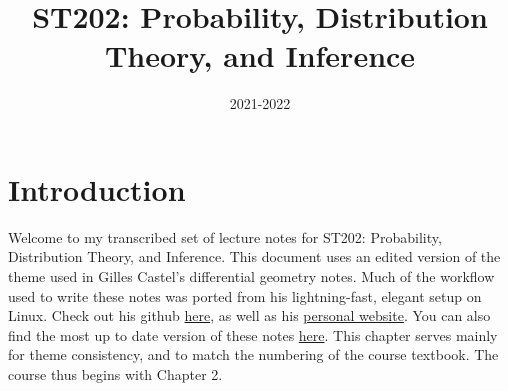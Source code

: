 \documentclass[a4paper]{report}
\title{\Huge\textsf{ST202: Probability, Distribution Theory, and Inference}}
\affil{\vskip.5cm\textsf{The London School of Economics and Political Science}}
\date{\textsf{2021-2022}}
\begin{document}
    \maketitle
    \tableofcontents
	\clearpage
\chapter{Introduction}
Welcome to my transcribed set of lecture notes for ST202: Probability, Distribution Theory, and Inference. This document uses an edited version of the theme used in Gilles Castel's differential geometry notes. Much of the workflow used to write these notes was ported from his lightning-fast, elegant setup on Linux. Check out his github \href{https://github.com/gillescastel}{here}, as well as his \href{https://castel.dev/}{personal website}. You can also find the most up to date version of these notes \href{https://github.com/meshkinyar}{here}. This chapter serves mainly for theme consistency, and to match the numbering of the course textbook. The course thus begins with Chapter 2.
    
    
    
    
    
    
    
    
    
    
    
    
    
    
    
    
    
    
    
    
    
\end{document}
